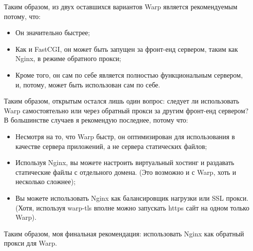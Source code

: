 %
Таким образом, из двух оставшихся вариантов Warp является рекомендуемым потому, что:
\begin{itemize}
  \item Он значительно быстрее;
  \item Как и FastCGI, он может быть запущен за фронт-енд сервером, таким как Nginx, в режиме обратного прокси;
  \item Кроме того, он сам по себе является полностью функциональным сервером, и, потому, может быть использован сам по себе.
\end{itemize}
%
%
%

Таким образом, открытым остался лишь один вопрос: следует ли использовать Warp самостоятельно или через обратный прокси за другим фронт-енд сервером? В большинстве случаев я рекомендую последнее, потому что:
\begin{itemize}
  \item Несмотря на то, что Warp быстр, он оптимизирован для использования в качестве сервера приложений, а не сервера статических файлов;
  \item Используя Nginx, вы можете настроить виртуальный хостинг и раздавать статические файлы с отдельного домена. (Это возможно и с Warp, хоть и несколько сложнее);
  \item Вы можете использовать Nginx как балансировщик нагрузки или SSL прокси. (Хотя, используя warp-tls вполне можно запускать https сайт на одном только Warp).
\end{itemize}

Таким образом, моя финальная рекомендация: использовать Nginx как обратный прокси для Warp.

